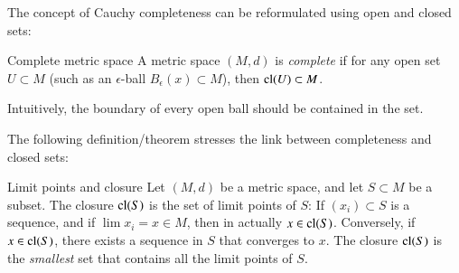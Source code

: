 The concept of Cauchy completeness can be reformulated using open and closed sets:
\begin{myDefinition}{Complete metric space}{}
    A metric space $(M,d)$ is \emph{complete} if for any open set $U \subset M$ (such as an $\epsilon$-ball $B_\epsilon(x) \subset M$), then $\operatorname{cl}(U) \subset M$.
\end{myDefinition}
Intuitively, the boundary of every open ball should be contained in the set.

The following definition/theorem stresses the link between completeness and closed sets:
\begin{myTheorem}{Limit points and closure}{}
    Let $(M,d)$ be a metric space, and let $S \subset M$ be a subset. The closure $\operatorname{cl}(S)$ is the set of limit points of $S$: If $(x_i)\subset S$ is a sequence, and if $\lim x_i = x \in M$, then in actually $x \in \operatorname{cl}(S)$. Conversely, if $x \in \operatorname{cl}(S)$, there exists a sequence in $S$ that converges to $x$. The closure $\operatorname{cl}(S)$ is the \emph{smallest} set that contains all the limit points of $S$.
\end{myTheorem}

